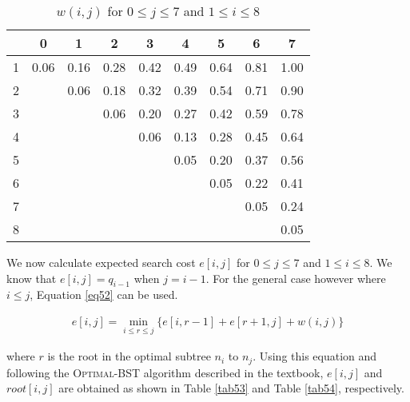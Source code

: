 \begin{table}[H]\centering
\begin{tabular}{c c c c c c c c c}
  & 0    & 1    & 2    & 3    & 4    & 5    & 6    & 7\\\hline
1 & 0.06 & 0.16 & 0.28 & 0.42 & 0.49 & 0.64 & 0.81 & 1.00\\
2 &      & 0.06 & 0.18 & 0.32 & 0.39 & 0.54 & 0.71 & 0.90\\
3 &      &      & 0.06 & 0.20 & 0.27 & 0.42 & 0.59 & 0.78\\
4 &      &      &      & 0.06 & 0.13 & 0.28 & 0.45 & 0.64\\
5 &      &      &      &      & 0.05 & 0.20 & 0.37 & 0.56\\
6 &      &      &      &      &      & 0.05 & 0.22 & 0.41\\
7 &      &      &      &      &      &      & 0.05 & 0.24\\
8 &      &      &      &      &      &      &      & 0.05\\\hline
\end{tabular}
\caption{$w(i,j)$ for $0 \leq j \leq 7$ and $1 \leq i \leq 8$}\label{tab52}
\end{table}

We now calculate expected search cost $e[i,j]$ for $0 \leq j \leq 7$ and $1 \leq i \leq 8$.
We know that $e[i,j] = q_{i-1}$ when $j = i - 1$.
For the general case however where $i \leq j$, Equation \ref{eq52} can be used.

\begin{equation}\label{eq52}
\begin{aligned}
e[i,j] = \min_{i \leq r \leq j} \{e[i, r-1] + e[r+1, j] + w(i,j)\}
\end{aligned}
\end{equation}

where $r$ is the root in the optimal subtree $n_i$ to $n_j$.
Using this equation and following the \textsc{Optimal-BST} algorithm described in the textbook, $e[i, j]$ and $root[i,j]$ are obtained as shown in Table \ref{tab53} and Table \ref{tab54}, respectively.

